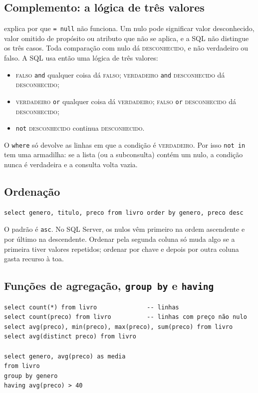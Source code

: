 \subsection*{Complemento: a lógica de três valores}

\textcite[seção 5.1.1]{Elmasri2011} explica por que \texttt{= null} não
funciona. Um nulo pode significar valor desconhecido, valor omitido de
propósito ou atributo que não se aplica, e a SQL não distingue os três
casos. Toda comparação com nulo dá \textsc{desconhecido}, e não
verdadeiro ou falso. A SQL usa então uma lógica de três valores:

\begin{itemize}
	\item \textsc{falso} \texttt{and} qualquer coisa dá \textsc{falso};
	\textsc{verdadeiro} \texttt{and} \textsc{desconhecido} dá
	\textsc{desconhecido};
	\item \textsc{verdadeiro} \texttt{or} qualquer coisa dá
	\textsc{verdadeiro}; \textsc{falso} \texttt{or} \textsc{desconhecido}
	dá \textsc{desconhecido};
	\item \texttt{not} \textsc{desconhecido} continua
	\textsc{desconhecido}.
\end{itemize}

O \texttt{where} só devolve as linhas em que a condição é
\textsc{verdadeiro}. Por isso \texttt{not in} tem uma armadilha: se a
lista (ou a subconsulta) contém um nulo, a condição nunca é verdadeira e
a consulta volta vazia.

\subsection{Ordenação}

\begin{lstlisting}
select genero, titulo, preco from livro order by genero, preco desc
\end{lstlisting}

O padrão é \texttt{asc}. No SQL Server, os nulos vêm primeiro na ordem
ascendente e por último na descendente. Ordenar pela segunda coluna só
muda algo se a primeira tiver valores repetidos; ordenar por chave e
depois por outra coluna gasta recurso à toa.

\subsection{Funções de agregação, \texttt{group by} e \texttt{having}}

\begin{lstlisting}
select count(*) from livro              -- linhas
select count(preco) from livro          -- linhas com preço não nulo
select avg(preco), min(preco), max(preco), sum(preco) from livro
select avg(distinct preco) from livro

select genero, avg(preco) as media
from livro
group by genero
having avg(preco) > 40
\end{lstlisting}

